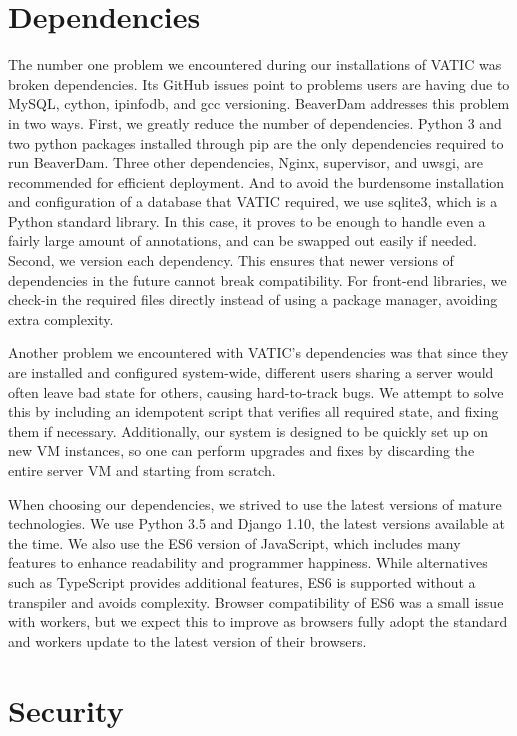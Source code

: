 \section{Dependencies}

The number one problem we encountered during our installations of VATIC was broken dependencies. 
Its GitHub issues point to problems users are having due to MySQL, cython, ipinfodb, and gcc versioning.
BeaverDam addresses this problem in two ways. 
First, we greatly reduce the number of dependencies.
Python 3 and two python packages installed through pip are the only dependencies required to run BeaverDam.
Three other dependencies, Nginx, supervisor, and uwsgi, are recommended for efficient deployment.
And to avoid the burdensome installation and configuration of a database that VATIC required, we use sqlite3, which is a Python standard library. 
In this case, it proves to be enough to handle even a fairly large amount of annotations, and can be swapped out easily if needed.
Second, we version each dependency. 
This ensures that newer versions of dependencies in the future cannot break compatibility. 
For front-end libraries, we check-in the required files directly instead of using a package manager, avoiding extra complexity.

Another problem we encountered with VATIC's dependencies was that since they are installed and configured system-wide, 
different users sharing a server would often leave bad state for others, causing hard-to-track bugs.
We attempt to solve this by including an idempotent script that verifies all required state, and fixing them if necessary.
Additionally, our system is designed to be quickly set up on new VM instances, 
so one can perform upgrades and fixes by discarding the entire server VM and starting from scratch.

When choosing our dependencies, we strived to use the latest versions of mature technologies.
We use Python 3.5 and Django 1.10, the latest versions available at the time.
We also use the ES6 version of JavaScript, which includes many features to enhance readability and programmer happiness.
While alternatives such as TypeScript provides additional features, ES6 is supported without a transpiler and avoids complexity.
Browser compatibility of ES6 was a small issue with workers, but we expect this to improve as browsers fully adopt the standard and workers update to the latest version of their browsers. 

\section{Security}

